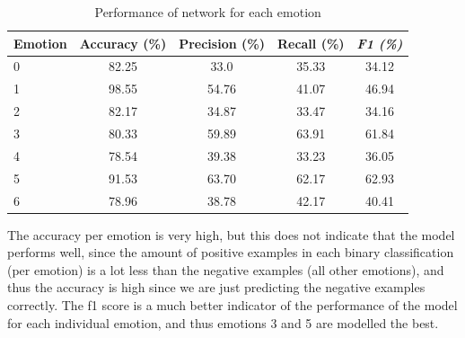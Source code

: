\documentclass[12pt,twoside]{article}
\begin{document}
\begin{table}[!htbp]
\centering
\begin{tabular}{|l|c|c|c|c|}
\hline
\textbf{Emotion} & \multicolumn{1}{l|}{\textbf{Accuracy (\%)}} & \multicolumn{1}{l|}{\textbf{Precision (\%)}} & \multicolumn{1}{l|}{\textbf{Recall (\%)}} & \multicolumn{1}{l|}{\textit{\textbf{F1 (\%)}}} \\ \hline
0                & 82.25                                       & 33.0                                         & 35.33                                     & 34.12                                          \\ \hline
1                & 98.55                                       & 54.76                                        & 41.07                                     & 46.94                                          \\ \hline
2                & 82.17                                       & 34.87                                        & 33.47                                     & 34.16                                          \\ \hline
3                & 80.33                                       & 59.89                                        & 63.91                                     & 61.84                                          \\ \hline
4                & 78.54                                       & 39.38                                        & 33.23                                     & 36.05                                          \\ \hline
5                & 91.53                                       & 63.70                                        & 62.17                                     & 62.93                                          \\ \hline
6                & 78.96                                       & 38.78                                        & 42.17                                     & 40.41                                          \\ \hline
\end{tabular}
\caption{Performance of network for each emotion}
\label{performance}
\end{table}
The accuracy per emotion is very high, but this does not indicate that the model performs well, since the amount of positive examples in each binary classification (per emotion) is a lot less than the negative examples (all other emotions), and thus the accuracy is high since we are just predicting the negative examples correctly. The f1 score is a much better indicator of the performance of the model for each individual emotion, and thus emotions 3 and 5 are modelled the best. 
\end{document}
